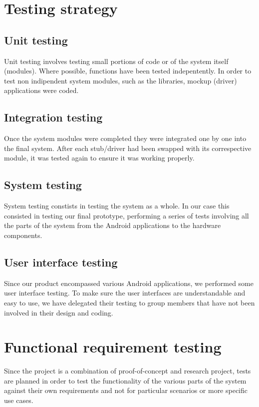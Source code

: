 \section{Testing strategy}

\subsection{Unit testing}
Unit testing involves testing small portions of code or of the system itself
(modules). Where possible, functions have been tested indepentently. In order to
test non indipendent system modules, such as the libraries, mockup (driver)
applications were coded.

\subsection{Integration testing}
Once the system modules were completed they were integrated one by one into the
final system. After each stub/driver had been swapped with its correspective
module, it was tested again to ensure it was working properly.

\subsection{System testing}
System testing constists in testing the system as a whole.
In our case this consisted in testing our final prototype, performing a series
of tests involving all the parts of the system from the Android applications
to the hardware components.

\subsection{User interface testing}
Since our product encompassed various Android applications, we performed some
user interface testing. To make sure the user interfaces are understandable and
easy to use, we have delegated their testing to group members that have not been
involved in their design and coding.

\section{Functional requirement testing}
Since the project is a combination of proof-of-concept and research project,
tests are planned in order to test the functionality of the various parts of the
system against their own requirements and not for particular scenarios or more
specific use cases.

